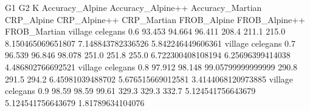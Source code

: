 G1 G2 K Accuracy_Alpine Accuracy_Alpine++ Accuracy_Martian CRP_Alpine CRP_Alpine++ CRP_Martian FROB_Alpine FROB_Alpine++ FROB_Martian
village celegans 0.6 93.453 94.664 96.411 208.4 211.1 215.0 8.150465069651807 7.148843782336526 5.842246449606361
village celegans 0.7 96.539 96.846 98.078 251.0 251.8 255.0 6.722300408108194 6.25696399414038 4.486802766692521
village celegans 0.8 97.912 98.148 99.05799999999999 290.8 291.5 294.2 6.45981039488702 5.676515669012581 3.4144068120973885
village celegans 0.9 98.59 98.59 99.61 329.3 329.3 332.7 5.124541756643679 5.124541756643679 1.81789634104076

